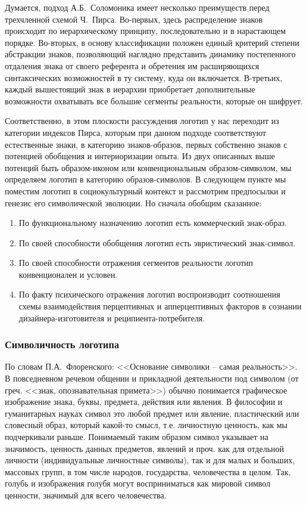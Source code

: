 Думается, подход А.Б.~Соломоника имеет несколько преимуществ перед трехчленной
схемой Ч.~Пирса. Во-первых, здесь распределение знаков происходит по
иерархическому принципу, последовательно и в нарастающем порядке. Во-вторых,
в основу классификации положен единый критерий степени абстракции знаков,
позволяющий наглядно представить динамику постепенного отдаления знака от
своего референта и обретения им расширяющихся синтаксических возможностей в ту
систему, куда он включается. В-третьих, каждый вышестоящий знак в иерархии
приобретает дополнительные возможности охватывать все большие сегменты реальности,
которые он шифрует.

Соответственно, в этом плоскости рассуждения логотип у нас переходит из категории
индексов Пирса, которым при данном подходе соответствуют естественные знаки,
в категорию знаков-образов, первых собственно знаков с потенцией обобщения и
интериоризации опыта. Из двух описанных выше потенций быть  образом-иконом
или конвенциональным образом-символом, мы определяем логотип в категорию
образов-символов. В следующем пункте мы поместим логотип в социокультурный
контекст и рассмотрим предпосылки и генезис его символической эволюции.
Но сначала обобщим сказанное:
\begin{enumerate}
\item По функциональному назначению логотип есть коммерческий знак-образ.
\item По своей способности обобщения логотип есть эвристический знак-символ.
\item По своей способности отражения сегментов реальности логотип конвенционален и условен.
\item По факту психического отражения логотип воспроизводит соотношения схемы
  взаимодействия перцептивных и апперцептивных факторов в сознании дизайнера-изготовителя
  и реципиента-потребителя.
\end{enumerate}

\subsubsection{Символичность логотипа}
По словам П.А.~Флоренского: <<Основание символики -- самая
реальность>>.\autocite[425]{book:florensky1} В повседневном речевом общении и прикладной
деятельности под символом (от греч. <<знак, опознавательная примета>>) обычно
понимается графическое изображение знака, буквы, предмета, действия или явления.
В философии и гуманитарных науках символ это любой предмет или явление,
пластический или словесный образ, который какой-то смысл, т.е. личностную ценность,
как мы подчеркивали раньше. Понимаемый таким образом символ указывает на значимость,
ценность данных предметов, явлений и проч. как для отдельной личности
(индивидуальные личностные символы), так и для малых и больших, массовых групп,
в том числе народов, государства, человечества в целом. Так, голубь и изображения
голубя могут восприниматься как мировой символ ценности, значимый для всего
человечества.

